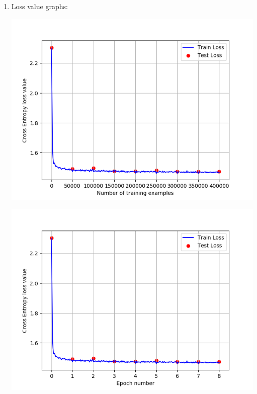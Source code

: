 \documentclass[a4paper]{iacas}
\begin{document}
\begin{enumerate}
\item Loss value graphs:

\vskip 0.1in
\begin{minipage}{\linewidth}
	\includegraphics[scale=0.8]{hw2_py/results/_14_01_43/lr_0_01_net_1_CE_/loss_value.png}
	\label{fig_1}
\end{minipage}
\vskip 0.1in
\begin{minipage}{\linewidth}
	\includegraphics[scale=0.8]{hw2_py/results/_14_01_43/lr_0_01_net_1_CE_/loss_value_epoch.png}
	\label{fig_2}
\end{minipage}
\vskip 0.1in


\end{enumerate}
\end{document}
